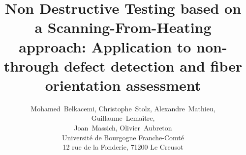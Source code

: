 \title{Non Destructive Testing based on a Scanning-From-Heating approach: Application to non-through defect detection and fiber orientation assessment}

\author{Mohamed~Belkacemi, Christophe~Stolz, Alexandre~Mathieu, Guillaume~Lema\^itre, \\Joan~Massich, Olivier~Aubreton\\
Universit\'e de Bourgogne Franche-Comt\'e\\
12 rue de la Fonderie, 71200 Le Creusot}
